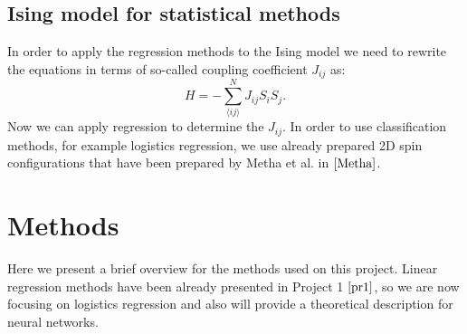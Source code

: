 \documentclass[10pt]{article}
\begin{document}
\subsection{Ising model for statistical methods}
In order to apply the regression methods to the Ising model we need to rewrite the equations in terms of so-called coupling coefficient $J_{ij}$ as:
\begin{equation}
H = -\sum_{\langle ij\rangle}^N J_{ij} S_{i}S_j.
\end{equation}  
Now we can apply regression to determine the $J_{ij}$.
In order to use classification methods, for example logistics regression, we use already prepared 2D spin configurations that have been prepared by Metha et al. in $\cite{Metha}$.

\section{Methods}
Here we present a brief overview for the methods used on this project. Linear regression methods have been already presented in Project 1 $\cite{pr1}$, so we are now focusing on logistics regression and also will provide a theoretical description for neural networks.
\end{document}

